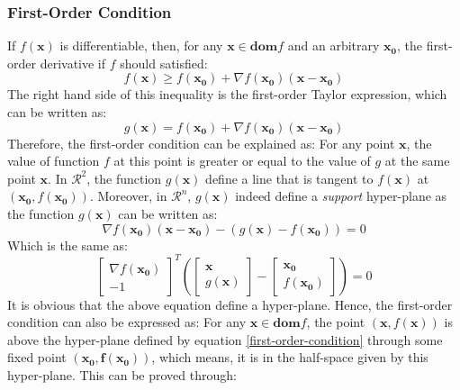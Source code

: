 \documentclass[10pt,a4paper]{article}
\begin{document}
\subsubsection{First-Order Condition}
If $f(\mathbf{x})$ is differentiable, then, for any $\mathbf{x} \in \mathbf{dom} f$ and an arbitrary $\mathbf{x_{0}}$, the first-order derivative if $f$ should satisfied:
\begin{equation}
	f(\mathbf{x}) \geq f(\mathbf{x_{0}}) + \nabla f(\mathbf{x_{0}})(\mathbf{x} - \mathbf{x_{0}})
	\label{1-condition}
\end{equation}
The right hand side of this inequality is the first-order Taylor expression, which can be written as:
\begin{equation*}
	g(\mathbf{x}) = f(\mathbf{x_{0}}) + \nabla f(\mathbf{x_{0}})(\mathbf{x} - \mathbf{x_{0}})
\end{equation*}
Therefore, the first-order condition can be explained as: For any point $\mathbf{x}$, the value of function $f$ at this point is greater or equal to the value of $g$ at the same point $\mathbf{x}$. In $\mathcal{R}^{2}$, the function $g(\mathbf{x})$ define a line that is tangent to $f(\mathbf{x})$ at $(\mathbf{x_{0}}, f(\mathbf{x_{0}}))$. Moreover, in $\mathcal{R}^{n}$, $g(\mathbf{x})$ indeed define a \textit{support} hyper-plane as the function $g(\mathbf{x})$ can be written as:
\begin{equation*}
	\nabla f(\mathbf{x_{0}})(\mathbf{x} - \mathbf{x_{0}}) - (g(\mathbf{x}) - f(\mathbf{x_{0}})) = 0
\end{equation*}
Which is the same as:
\begin{equation}
	\begin{bmatrix}
	\nabla f(\mathbf{x_{0}}) \\
	-1
	\end{bmatrix} ^{T}(
	\begin{bmatrix}
		\mathbf{x} \\
		g(\mathbf{x})
	\end{bmatrix} - 
	\begin{bmatrix}
		\mathbf{x_{0}} \\
		f(\mathbf{x_{0}})
	\end{bmatrix}) = 0
	\label{first-order-condition}
\end{equation}
It is obvious that the above equation define a hyper-plane. Hence, the first-order condition can also be expressed as: For any $\mathbf{x} \in \mathbf{dom}f$, the point $(\mathbf{x}, f(\mathbf{x}))$ is above the hyper-plane defined by equation \ref{first-order-condition} through some fixed point $(\mathbf{x_{0}, f(\mathbf{x_{0}})})$, which means, it is in the half-space given by this hyper-plane. This can be proved through:
\end{document}
